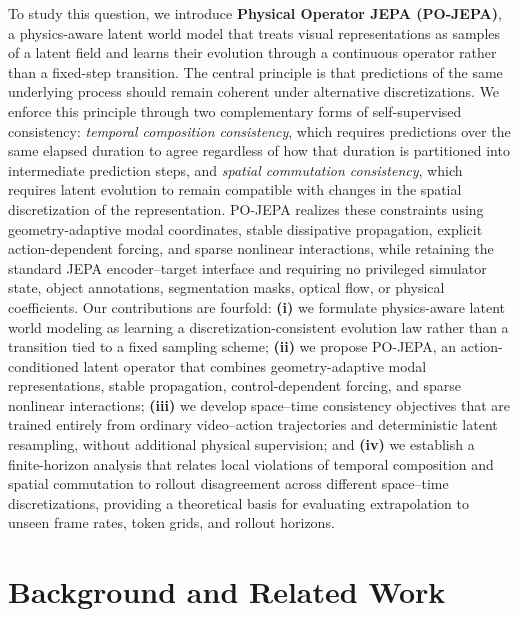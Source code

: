 \documentclass{article}
\theoremstyle{plain}
\theoremstyle{definition}
\theoremstyle{remark}
\newcommand{\POJEPA}{\textsc{PO-JEPA}}
\begin{document}
To study this question, we introduce \textbf{Physical Operator JEPA (\POJEPA{})}, a physics-aware latent world model that treats visual representations as samples of a latent field and learns their evolution through a continuous operator rather than a fixed-step transition. The central principle is that predictions of the same underlying process should remain coherent under alternative discretizations. We enforce this principle through two complementary forms of self-supervised consistency: \emph{temporal composition consistency}, which requires predictions over the same elapsed duration to agree regardless of how that duration is partitioned into intermediate prediction steps, and \emph{spatial commutation consistency}, which requires latent evolution to remain compatible with changes in the spatial discretization of the representation. \POJEPA{} realizes these constraints using geometry-adaptive modal coordinates, stable dissipative propagation, explicit action-dependent forcing, and sparse nonlinear interactions, while retaining the standard JEPA encoder--target interface and requiring no privileged simulator state, object annotations, segmentation masks, optical flow, or physical coefficients. Our contributions are fourfold: \textbf{(i)} we formulate physics-aware latent world modeling as learning a discretization-consistent evolution law rather than a transition tied to a fixed sampling scheme; \textbf{(ii)} we propose \POJEPA{}, an action-conditioned latent operator that combines geometry-adaptive modal representations, stable propagation, control-dependent forcing, and sparse nonlinear interactions; \textbf{(iii)} we develop space--time consistency objectives that are trained entirely from ordinary video--action trajectories and deterministic latent resampling, without additional physical supervision; and \textbf{(iv)} we establish a finite-horizon analysis that relates local violations of temporal composition and spatial commutation to rollout disagreement across different space--time discretizations, providing a theoretical basis for evaluating extrapolation to unseen frame rates, token grids, and rollout horizons.

\section{Background and Related Work}
\label{sec:related}
\end{document}
